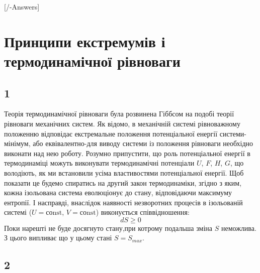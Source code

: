 
[\currfilebase/\currfilebase-Answers]
\chapter{Принципи екстремумів і термодинамічної рівноваги}\label{\currfilebase}
\makeatletter
{}
\makeatother

\section{1}
Теорія термодинамічної рівноваги була розвинена Гіббсом на подобі теорії рівноваги механічних систем. Як відомо, в механічній системі рівноважному положенню відповідає екстремальне положення потенціальної енергії системи-мінімум, або еквівалентно-для виводу системи із положення рівноваги необхідно виконати над нею роботу. Розумно припустити, що роль потенціальної енергії в термодинаміці можуть виконувати термодинамічні потенціали $U$, $F$, $H$, $G$, що володіють, як ми встановили усіма властивостями потенціальної енергії. Щоб показати це будемо спиратись на другий закон термодинаміки, згідно з яким, кожна ізольована система еволюціонує до стану, відповідаючи максимуму ентропії. І насправді, внаслідок наявності незворотних процесів в ізольованій системі ($U = \text{соnst}$, $V = \text{соnst}$) виконується співвідношення:
\begin{equation}\label{7.1}
	dS\geq0
\end{equation}
Поки нарешті не буде досягнуто стану,при котрому подальша зміна $S$ неможлива. З цього випливає що у цьому стані $S = S_{max}$.

\section{2}

